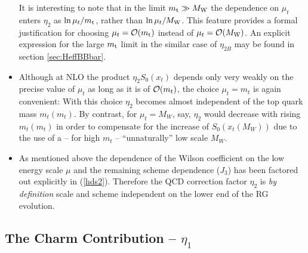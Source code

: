 \begin{itemize}
It is interesting to note that in the limit $m_{\rm t}\gg M_{\rm W}$ the dependence
on $\mu_t$ enters $\eta_2$ as $\ln\mu_t/m_{\rm t}$, rather than
$\ln\mu_t/M_{\rm W}$. This feature provides a formal justification for
choosing $\mu_t={\cal O}(m_{\rm t})$ instead of $\mu_t={\cal O}(M_{\rm W})$. An explicit
expression for the large $m_{\rm t}$ limit in the similar case of $\eta_{2B}$
may be found in section \ref{sec:HeffBBbar}.
\item
Although at NLO the product $\eta_2 S_0(x_t)$ depends only very weakly
on the precise value of $\mu_t$ as long as it is of ${\cal O}(m_t)$, the
choice $\mu_t=m_t$ is again convenient:  With this choice $\eta_2$
becomes almost independent of the top quark mass $m_t(m_t)$. By
contrast, for $\mu_t=M_W$, say, $\eta_2$ would decrease with rising
$m_t(m_t)$ in order to compensate for the increase of $S_0(x_t(M_W))$
due to the use of a -- for high $m_t$ -- ``unnaturally'' low scale
$M_W$.
\item
As mentioned above the dependence of the Wilson coefficient on the
low energy scale $\mu$ and the remaining scheme dependence ($J_3$)
has been factored out explicitly in (\ref{hds2}). Therefore the
QCD correction factor $\eta_2$ is {\it by definition\/}
scale and scheme independent on the lower end of the RG evolution.
\end{itemize}

\subsection{The Charm Contribution -- $\eta_1$}
\label{sec:HeffKKbar:eta1}


